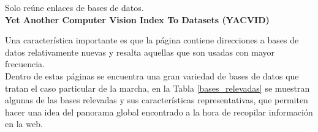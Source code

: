 	 Solo reúne enlaces de bases de datos.\\
		

\hspace{-0.7cm} \textbf{Yet Another Computer Vision Index To Datasets (YACVID) \cite{YACVID} } %

Una característica importante es que la página contiene direcciones a bases de datos relativamente nuevas y resalta aquellas que son usadas con mayor frecuencia. \\
	
	
Dentro de estas páginas se encuentra una gran variedad de bases de datos que tratan el caso particular de la marcha, en la Tabla \ref{bases_relevadas} se muestran algunas de las bases relevadas y sus características representativas, que permiten hacer una idea del panorama global encontrado a la hora de recopilar información en la web.  

